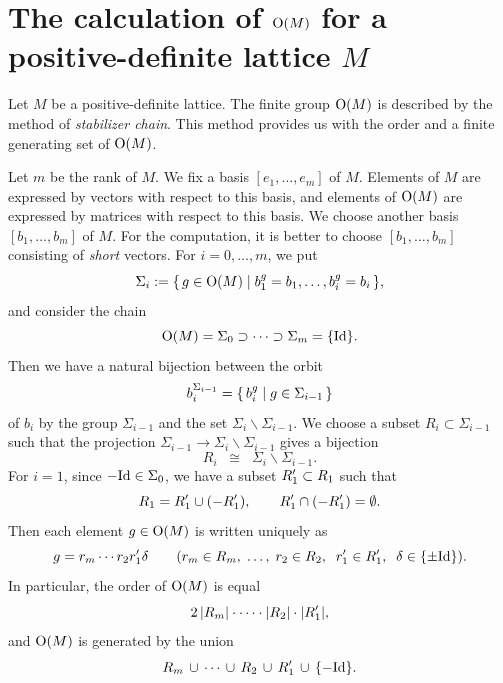 \documentclass{amsart} %
\begin{document}
\section{The calculation of $\mathord{\mathrm{O}}(M)$ for a positive-definite lattice $M$}
%
Let $M$ be a positive-definite lattice.
The finite group $\mathord{\mathrm{O}}(M)$ is described by the method of \emph{stabilizer chain}.
This method provides us with the order and a finite generating set of $\mathord{\mathrm{O}}(M)$.
\par
Let $m$ be the rank of $M$.
We fix a basis $[e_1, \dots, e_m]$ of $M$.
Elements of $M$ are expressed by vectors 
with respect to this basis, and 
elements of  $\mathord{\mathrm{O}}(M)$ are expressed by matrices
with respect to this basis.
We choose another  basis $[b_1, \dots, b_m]$ of $M$.
For the computation,
 it is better to choose $[b_1, \dots, b_m]$
 consisting of \emph{short}  vectors.
 For $i=0, \dots, m$, 
we put
\[
\Sigma_i:=\{\,{g\in \mathord{\mathrm{O}}(M)}\mid {b_1^g=b_1, \dots, b_i^g=b_i} \,\},
\]
and consider the chain 
\[
\mathord{\mathrm{O}}(M)=\Sigma_0\supset \dots\supset \Sigma_m=\{\mathord{\mathrm{Id}}\}.
\]
Then we have a natural bijection between 
the orbit 
\[
b_i^{\Sigma_{i-1}}=\{\,{b_i^g}\mid {g\in \Sigma_{i-1}} \,\}
\]
 of $b_i$ by 
the group $\Sigma_{i-1}$ and 
the set $\Sigma_i\backslash \Sigma_{i-1}$.
We choose a subset 
$R_i \subset \Sigma_{i-1}$ such that the  projection 
$\Sigma_{i-1} \to\Sigma_i\backslash \Sigma_{i-1}$ gives a bijection
\[
R_i\;\;\cong\;\;  \Sigma_i\backslash \Sigma_{i-1}.
\]
For $i=1$, since $-\mathord{\mathrm{Id}}\in \Sigma_0$,
we have a subset $R_1^{\prime} \subset R_1$ such that
\[
R_1=R_1^{\prime}\cup (-R_1^{\prime}),
\qquad
R_1^{\prime}\cap (-R_1^{\prime})=\emptyset.
\]
Then each element 
$g\in \mathord{\mathrm{O}}(M)$ 
is written uniquely as 
\[
g=r_m \cdots r_2 r_1^{\prime} \delta \qquad
 (r_m\in R_m,\;  \dots, \; r_2\in R_2, \;\; r_1^{\prime}\in R_1^{\prime},\;\;  \delta\in \{\pm \mathord{\mathrm{Id}}\}).
\]
In particular,  the order of $\mathord{\mathrm{O}}(M)$ is equal %
\[
2\,|R_m|\cdot \cdots \cdot|R_2| \cdot |R_1^{\prime}|, 
\]
and $\mathord{\mathrm{O}}(M)$ is generated by the union 
\[
R_m\, \cup\, \cdots\,  \cup \,R_2\,\cup\, R_1^{\prime}\,\cup\,  \{- \mathord{\mathrm{Id}}\}.
\]
\end{document}
